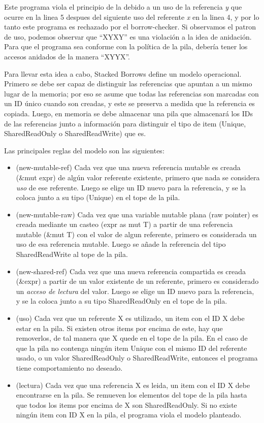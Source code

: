 Este programa viola el principio de la debido a un uso de la referencia \textit{y} que ocurre en la linea 5 despues del siguiente uso del referente \textit{x} en la linea 4, y por lo tanto este programa es rechazado por el borrow-checker. Si observamos el patron de uso, podemos observar que ``XYXY'' es una violación a la idea de anidación. Para que el programa sea conforme con la política de la pila, debería tener los accesos anidados de la manera ``XYYX''.

Para llevar esta idea a cabo, Stacked Borrows define un modelo operacional. Primero se debe ser capaz de distinguir las referencias que apuntan a un mismo lugar de la memoria; por eso se asume que todas las referencias son marcadas con un ID único cuando son creadas, y este se preserva a medida que la referencia es copiada. Luego, en memoria se debe almacenar una pila que almacenará los IDs de las referencias junto a información para distinguir el tipo de item (Unique, SharedReadOnly o SharedReadWrite) que es.

Las principales reglas del modelo son las siguientes:
\begin{itemize}
    \item (new-mutable-ref) Cada vez que una nueva referencia mutable es creada (\&mut expr) de algún valor referente existente, primero que nada se considera \textit{uso} de ese referente. Luego se elige un ID nuevo para la referencia, y se la coloca junto a su tipo (Unique) en el tope de la pila.
    \item (new-mutable-raw) Cada vez que una variable mutable plana (raw pointer) es creada mediante un casteo (expr as \*mut T) a partir de una referencia mutable (\&mut T) con el valor de algun referente, primero es considerada un uso de esa referencia mutable. Luego se añade la referencia del tipo SharedReadWrite al tope de la pila.
    \item (new-shared-ref) Cada vez que una nueva referencia compartida es creada (\&expr) a partir de un valor existente de un referente, primero es considerado un \textit{acceso de lectura} del valor. Luego se elige un ID nuevo para la referencia, y se la coloca junto a su tipo SharedReadOnly en el tope de la pila.
    \item (uso) Cada vez que un referente X es utilizado, un item con el ID X debe estar en la pila. Si existen otros items por encima de este, hay que removerlos, de tal manera que X quede en el tope de la pila. En el caso de que la pila no contenga ningún item Unique con el mismo ID del referente usado, o un valor SharedReadOnly o SharedReadWrite, entonces el programa tiene comportamiento no deseado.
    \item (lectura) Cada vez que una referencia X es leida, un item con el ID X debe encontrarse en la pila. Se remueven los elementos del tope de la pila hasta que todos los items por encima de X son SharedReadOnly. Si no existe ningún item con ID X en la pila, el programa viola el modelo planteado.
\end{itemize}

